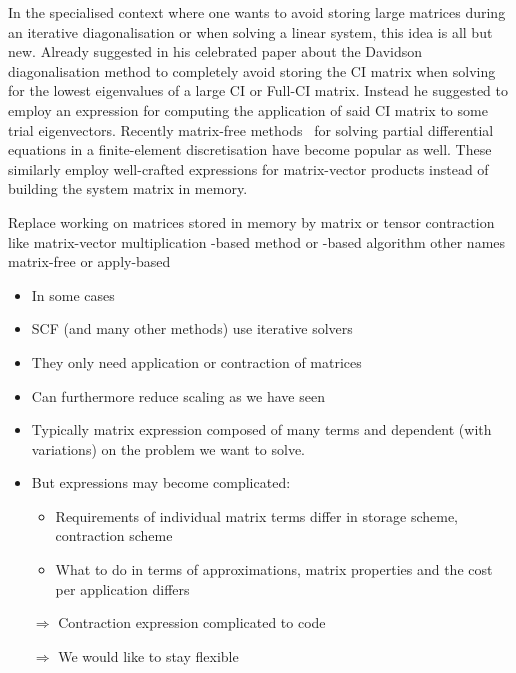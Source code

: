 In the specialised context where one wants to avoid storing
large matrices during an iterative diagonalisation
or when solving a linear system,
this idea is all but new.
Already \citet{Davidson1975} suggested in his celebrated paper
about the Davidson diagonalisation method
to completely avoid storing the CI matrix when solving for the
lowest eigenvalues of a large CI or Full-CI matrix.
Instead he suggested to employ an expression for computing
the application of said CI matrix to some trial eigenvectors.
Recently matrix-free methods~\cite{Kronbichler2012}
for solving partial differential equations
in a finite-element discretisation
have become popular as well.
These similarly employ well-crafted expressions for matrix-vector
products instead of building the \FE system matrix in memory.



Replace working on matrices stored in memory
by matrix or tensor contraction
like matrix-vector multiplication
\contraction-based method or \contraction-based algorithm
other names matrix-free or apply-based

\begin{itemize}
	\item In some cases 
	\item SCF (and many other methods) use iterative solvers
	\item They only need application or contraction of matrices
	\item Can furthermore reduce scaling as we have seen
	\item Typically matrix expression composed of many terms and dependent (with variations) on the problem we want to solve.
	\item But expressions may become complicated:
		\begin{itemize}
			\item Requirements of individual matrix terms differ in storage scheme, contraction scheme
			\item What to do in terms of approximations, matrix properties and the cost per application differs
		\end{itemize}
	\item[$\Rightarrow$] Contraction expression complicated to code
	\item[$\Rightarrow$] We would like to stay flexible
\end{itemize}



